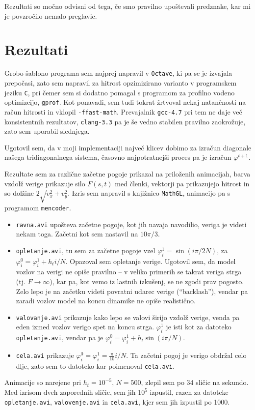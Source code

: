 \documentclass[a4 paper, 12pt]{article}
\newcommand{\vfi}{
    \ensuremath{\varphi}
}
\begin{document}
Rezultati so mo\v cno odvisni od tega, \v ce smo pravilno upo\v stevali predznake, kar mi je povzro\v cilo nemalo
preglavic.

\section{Rezultati}

Grobo \v sablono programa sem najprej napravil v {\tt Octave}, ki pa se je izvajala prepo\v casi, zato sem
napravil za hitrost opzimizirano varianto v programskem jeziku {\tt C}, pri \v cemer sem si dodatno pomagal
s programom za profilno vodeno optimizcijo, {\tt gprof}. Kot ponavadi, sem tudi tokrat \v zrtvoval nekaj
natan\v cnosti na ra\v cun hitrosti in vklopil {\tt -ffast-math}. Prevajalnik {\tt gcc-4.7} pri tem ne daje ve\v c
konsistentnih rezultatov, {\tt clang-3.3} pa je \v se vedno stabilen pravilno zaokro\v zuje, zato sem uporabil
slednjega.

Ugotovil sem, da v moji implementaciji najve\v c klicev dobimo za izra\v cun diagonale na\v sega tridiagonalnega
sistema, \v casovno najpotratnej\v si proces pa je izra\v cun $\vfi^{t+1}$.

Rezultate sem za razli\v cne za\v cetne pogoje prikazal na prilo\v zenih animacijah, barva vzdol\v z verige
prikazuje silo $F(s,t)$ med \v clenki, vektorji pa prikazujejo hitrost in so dol\v zine $2\sqrt{v_x^2 + v_y^2}$.
Izris sem napravil s knji\v znico {\tt MathGL}, animacijo pa s programom {\tt mencoder}.
\begin{itemize}
    \item{{\tt ravna.avi} upo\v steva za\v cetne pogoje, kot jih navaja navodilio, veriga je videti nekam toga.
        Za\v cetni kot sem nastavil na $10\pi/3$.}
    \item{{\tt opletanje.avi}, tu sem za za\v cetne pogoje vzel $\vfi^1_i = \sin(i\pi/2N)$, za
        $\vfi^0_i = \vfi^1_i + h_t i/N$. Opazoval sem opletanje verige. Ugotovil sem, da model vozlov na verigi ne
        opi\v se pravilno -- v veliko primerih se takrat veriga strga (tj. $F \to \infty$), kar pa, kot vemo iz lastnih
        izku\v senj, se ne zgodi prav pogosto. Zelo lepo je na za\v cetku videti povratni udarec verige ("`backlash"'),
        vendar pa zaradi vozlov model na koncu dinamike ne opi\v se realisti\v cno.}
    \item{{\tt valovanje.avi} prikazuje kako lepo se valovi \v sirijo vzdol\v z verige, venda pa eden izmed vozlov verigo
        spet na koncu strga. $\vfi^1_i$ je isti kot za datoteko {\tt opletanje.avi}, vendar pa je
        $\vfi^0_i = \vfi^1_i + h_t\sin(i\pi/N)$.}
    \item{{\tt cela.avi} prikazuje $\vfi^0_i = \vfi^1_i = \frac{\pi}{10}i/N$. Ta za\v cetni pogoj je verigo obdr\v zal
        celo dlje, zato sem to datoteko kar poimenoval {\tt cela.avi}.}
\end{itemize}
Animacije so narejene pri $h_t = 10^{-5}$, $N = 500$, zlepil sem po 34 sli\v cic na sekundo. Med izrisom dveh zaporednih
sli\v cic, sem jih $10^5$ izpustil, razen za datoteke {\tt opletanje.avi}, {\tt valovenje.avi} in {\tt cela.avi}, kjer
sem jih izpustil po 1000.
\end{document}
